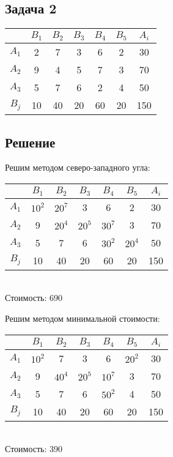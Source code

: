 \documentclass[12pt]{article}
\begin{document}
\subsection*{Задача 2}
\begin{table}[h!]
\begin{center}
\begin{tabular}{|c|c|c|c|c|c|c|}
\hline
           & $B_1$ & $B_2$ & $B_3$ & $B_4$ & $B_5$ & $A_i$	\\
\hline
 $A_1$ & 2 & 7 & 3 & 6 & 2 & 30	\\
\hline
 $A_2$ & 9 & 4 & 5 & 7 & 3 & 70	\\
\hline
 $A_3$ & 5 & 7 & 6 & 2 & 4 & 50	\\
\hline
 $B_j$ & 10 & 40 & 20 & 60 & 20 & 150	\\
\hline
\end{tabular}
\end{center}
\end{table} 
\subsection*{Решение}
Решим методом северо-западного угла:
\begin{table}[h!]
\begin{center}
\begin{tabular}{|c|c|c|c|c|c|c|}
\hline
           & $B_1$ & $B_2$ & $B_3$ & $B_4$ & $B_5$ & $A_i$	\\
\hline
 $A_1$ & $10^2$ & $20^7$ & 3 & 6 & 2 & 30	\\
\hline
 $A_2$ & 9 & $20^4$ & $20^5$ & $30^7$ & 3 & 70	\\
\hline
 $A_3$ & 5 & 7 & 6 & $30^2$ & $20^4$ & 50	\\
\hline
 $B_j$ & 10 & 40 & 20 & 60 & 20 & 150	\\
\hline
\end{tabular}\\

Стоимость: 690
\end{center}
\end{table} 

Решим методом минимальной стоимости:
\begin{table}[h!]
\begin{center}
\begin{tabular}{|c|c|c|c|c|c|c|}
\hline
           & $B_1$ & $B_2$ & $B_3$ & $B_4$ & $B_5$ & $A_i$	\\
\hline
 $A_1$ & $10^2$ & 7 & 3 & 6 & $20^2$ & 30	\\
\hline
 $A_2$ & 9 & $40^4$ & $20^5$ & $10^7$ & 3 & 70	\\
\hline
 $A_3$ & 5 & 7 & 6 & $50^2$ & 4 & 50	\\
\hline
 $B_j$ & 10 & 40 & 20 & 60 & 20 & 150	\\
\hline
\end{tabular}\\
Стоимость: 390
\end{center}
\end{table} 
\newpage
\end{document}
